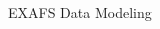 
\begin{slide}{EXAFS Data Modeling}
  \small
  \begin{cenpage}{80mm}\setlength{\baselineskip}{10pt}
    \vfill
    \begin{center}
    {\Huge{}}
    \end{center}

    \vfill
  \end{cenpage}
\end{slide} 
